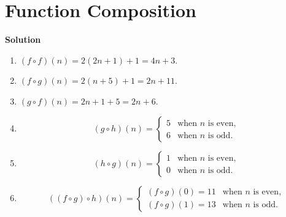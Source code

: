 \documentclass{../../cls/sig-alternate-05-2015}
\begin{document}
\section{Function Composition}
\textbf{Solution}\begin{enumerate}[label=(\alph*)]
\item $(f \circ f)(n) = 2 (2n + 1) + 1 = 4n + 3$.
\item $(f \circ g)(n) = 2(n + 5) + 1 = 2n + 11$.
\item $(g \circ f)(n) = 2n + 1 + 5 = 2n + 6$.
\item \begin{equation}
(g \circ h)(n) = \begin{cases}
5 & \text{when $n$ is even},\\
6 & \text{when $n$ is odd}.
\end{cases}
\end{equation}
\item \begin{equation}
(h \circ g)(n) = \begin{cases}
1 & \text{when $n$ is even},\\
0 & \text{when $n$ is odd}.
\end{cases}
\end{equation}
\item \begin{equation}
((f \circ g) \circ h)(n) = \begin{cases}
(f \circ g)(0) = 11 & \text{when $n$ is even},\\
(f \circ g)(1) = 13 & \text{when $n$ is odd}.
\end{cases}
\end{equation}
\end{enumerate}
\end{document}
